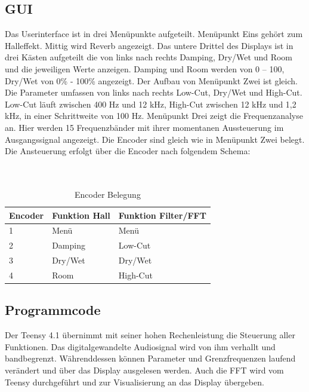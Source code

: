 \documentclass[12pt]{article}
\begin{document}
\subsection{GUI}
Das Userinterface ist in drei Menüpunkte aufgeteilt. Menüpunkt Eins gehört zum Halleffekt. Mittig wird Reverb angezeigt. 
Das untere Drittel des Displays ist in drei Kästen aufgeteilt die von links nach rechts Damping, Dry/Wet und Room und die jeweiligen Werte anzeigen. 
Damping und Room werden von 0 – 100, Dry/Wet von 0\% - 100\% angezeigt. Der Aufbau von Menüpunkt Zwei ist gleich. 
Die Parameter umfassen von links nach rechts Low-Cut, Dry/Wet und High-Cut. Low-Cut läuft zwischen 400 Hz und 12 kHz, High-Cut zwischen 12 kHz und 1,2 kHz, in einer Schrittweite von 100 Hz. 
Menüpunkt Drei zeigt die Frequenzanalyse an. Hier werden 15 Frequenzbänder mit ihrer momentanen Aussteuerung im Ausgangssignal angezeigt. Die Encoder sind gleich wie in Menüpunkt Zwei belegt.
Die Ansteuerung erfolgt über die Encoder nach folgendem Schema:
\\
\\
\\
\begin{table}[h]
    \centering
    \caption{Encoder Belegung}
    \label{tbl:encoderbelegung}
    \begin{tabular}{l|l|l}
      \textbf{Encoder}  & \textbf{Funktion Hall} & \textbf{Funktion Filter/FFT}\\
      \hline
      1 & Menü & Menü \\
   
      2 & Damping & Low-Cut \\
   
      3 & Dry/Wet & Dry/Wet \\
      
      4 & Room & High-Cut \\
     

    \end{tabular}    

\end{table}

\newpage

\subsection{Programmcode}
Der Teensy 4.1 übernimmt mit seiner hohen Rechenleistung die Steuerung aller Funktionen. 
Das digitalgewandelte Audiosignal wird von ihm verhallt und bandbegrenzt. 
Währenddessen können Parameter und Grenzfrequenzen laufend verändert und über das Display ausgelesen werden. 
Auch die FFT wird vom Teensy durchgeführt und zur Visualisierung an das Display übergeben.
\end{document}
